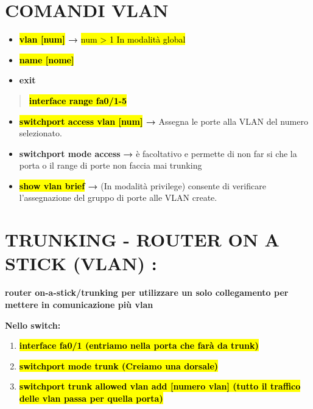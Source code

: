 \section{}\label{section-1}

\section{COMANDI VLAN}\label{comandi-vlan}

\begin{itemize}
\item
  \textbf{\hl{vlan {[}num{]}} →} \hl{num \textgreater{} 1 In modalità
  global}
\item
  \textbf{\hl{name {[}nome{]}}}
\item
  \textbf{exit}
\end{itemize}

\begin{quote}
\textbf{\hl{interface range fa0/1-5}}
\end{quote}

\begin{itemize}
\item
  \textbf{\hl{switchport access vlan {[}num{]}} →} Assegna le porte alla
  VLAN del numero selezionato.
\item
  \textbf{switchport mode access} \textbf{→} è facoltativo e permette di
  non far si che la porta o il range di porte non faccia mai trunking
\item
  \textbf{\hl{show vlan brief} →} (In modalità privilege) consente di
  verificare l'assegnazione del gruppo di porte alle VLAN create.
\end{itemize}

\section{TRUNKING - ROUTER ON A STICK (VLAN)
:}\label{trunking---router-on-a-stick-vlan}

\textbf{router on-a-stick/trunking per utilizzare un solo collegamento
per mettere in comunicazione più vlan}

\textbf{Nello switch:}

\begin{enumerate}
\def\labelenumi{\arabic{enumi}.}
\item
  \textbf{\hl{interface fa0/1 (entriamo nella porta che farà da trunk)}}
\item
  \textbf{\hl{switchport mode trunk (Creiamo una dorsale)}}
\item
  \textbf{\hl{switchport trunk allowed vlan add {[}numero vlan{]} (tutto
  il traffico delle vlan passa per quella porta)}}
\end{enumerate}

